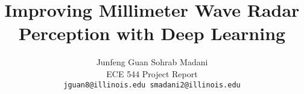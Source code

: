 \documentclass[10pt,twocolumn,letterpaper]{article}
\begin{document}
\title{Improving Millimeter Wave Radar Perception with Deep Learning}

\author{Junfeng Guan \hspace{2cm} Sohrab Madani\\
ECE 544 Project Report\\
{\tt\small jguan8@illinois.edu  \hspace{2cm} smadani2@illinois.edu}
}

\maketitle










\newpage

{\small


}
\end{document}
